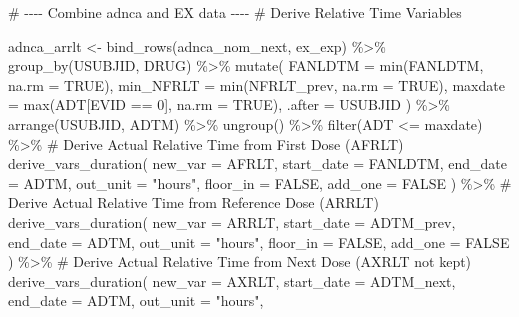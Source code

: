 \documentclass[
  letterpaper,
  DIV=11,
  numbers=noendperiod]{scrreprt}
\newenvironment{Shaded}{\begin{snugshade}}{\end{snugshade}}
\newcommand{\AttributeTok}[1]{\textcolor[rgb]{0.40,0.45,0.13}{#1}}
\newcommand{\CommentTok}[1]{\textcolor[rgb]{0.37,0.37,0.37}{#1}}
\newcommand{\ConstantTok}[1]{\textcolor[rgb]{0.56,0.35,0.01}{#1}}
\newcommand{\DecValTok}[1]{\textcolor[rgb]{0.68,0.00,0.00}{#1}}
\newcommand{\FunctionTok}[1]{\textcolor[rgb]{0.28,0.35,0.67}{#1}}
\newcommand{\NormalTok}[1]{\textcolor[rgb]{0.00,0.23,0.31}{#1}}
\newcommand{\OtherTok}[1]{\textcolor[rgb]{0.00,0.23,0.31}{#1}}
\newcommand{\SpecialCharTok}[1]{\textcolor[rgb]{0.37,0.37,0.37}{#1}}
\newcommand{\StringTok}[1]{\textcolor[rgb]{0.13,0.47,0.30}{#1}}
\begin{document}
\begin{Shaded}
\begin{Highlighting}[]
\CommentTok{\# {-}{-}{-}{-} Combine adnca and EX data {-}{-}{-}{-}}
\CommentTok{\# Derive Relative Time Variables}

\NormalTok{adnca\_arrlt }\OtherTok{\textless{}{-}} \FunctionTok{bind\_rows}\NormalTok{(adnca\_nom\_next, ex\_exp) }\SpecialCharTok{\%\textgreater{}\%}
  \FunctionTok{group\_by}\NormalTok{(USUBJID, DRUG) }\SpecialCharTok{\%\textgreater{}\%}
  \FunctionTok{mutate}\NormalTok{(}
    \AttributeTok{FANLDTM =} \FunctionTok{min}\NormalTok{(FANLDTM, }\AttributeTok{na.rm =} \ConstantTok{TRUE}\NormalTok{),}
    \AttributeTok{min\_NFRLT =} \FunctionTok{min}\NormalTok{(NFRLT\_prev, }\AttributeTok{na.rm =} \ConstantTok{TRUE}\NormalTok{),}
    \AttributeTok{maxdate =} \FunctionTok{max}\NormalTok{(ADT[EVID }\SpecialCharTok{==} \DecValTok{0}\NormalTok{], }\AttributeTok{na.rm =} \ConstantTok{TRUE}\NormalTok{), }\AttributeTok{.after =}\NormalTok{ USUBJID}
\NormalTok{  ) }\SpecialCharTok{\%\textgreater{}\%}
  \FunctionTok{arrange}\NormalTok{(USUBJID, ADTM) }\SpecialCharTok{\%\textgreater{}\%}
  \FunctionTok{ungroup}\NormalTok{() }\SpecialCharTok{\%\textgreater{}\%}
  \FunctionTok{filter}\NormalTok{(ADT }\SpecialCharTok{\textless{}=}\NormalTok{ maxdate) }\SpecialCharTok{\%\textgreater{}\%}
  \CommentTok{\# Derive Actual Relative Time from First Dose (AFRLT)}
  \FunctionTok{derive\_vars\_duration}\NormalTok{(}
    \AttributeTok{new\_var =}\NormalTok{ AFRLT,}
    \AttributeTok{start\_date =}\NormalTok{ FANLDTM,}
    \AttributeTok{end\_date =}\NormalTok{ ADTM,}
    \AttributeTok{out\_unit =} \StringTok{"hours"}\NormalTok{,}
    \AttributeTok{floor\_in =} \ConstantTok{FALSE}\NormalTok{,}
    \AttributeTok{add\_one =} \ConstantTok{FALSE}
\NormalTok{  ) }\SpecialCharTok{\%\textgreater{}\%}
  \CommentTok{\# Derive Actual Relative Time from Reference Dose (ARRLT)}
  \FunctionTok{derive\_vars\_duration}\NormalTok{(}
    \AttributeTok{new\_var =}\NormalTok{ ARRLT,}
    \AttributeTok{start\_date =}\NormalTok{ ADTM\_prev,}
    \AttributeTok{end\_date =}\NormalTok{ ADTM,}
    \AttributeTok{out\_unit =} \StringTok{"hours"}\NormalTok{,}
    \AttributeTok{floor\_in =} \ConstantTok{FALSE}\NormalTok{,}
    \AttributeTok{add\_one =} \ConstantTok{FALSE}
\NormalTok{  ) }\SpecialCharTok{\%\textgreater{}\%}
  \CommentTok{\# Derive Actual Relative Time from Next Dose (AXRLT not kept)}
  \FunctionTok{derive\_vars\_duration}\NormalTok{(}
    \AttributeTok{new\_var =}\NormalTok{ AXRLT,}
    \AttributeTok{start\_date =}\NormalTok{ ADTM\_next,}
    \AttributeTok{end\_date =}\NormalTok{ ADTM,}
    \AttributeTok{out\_unit =} \StringTok{"hours"}\NormalTok{,}

\end{Highlighting}
\end{Shaded}
\end{document}
